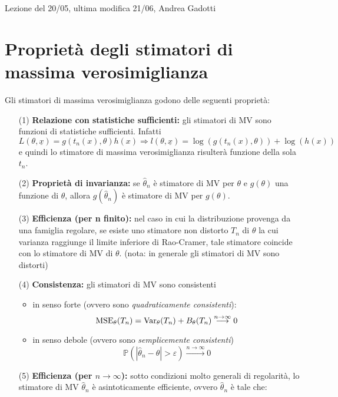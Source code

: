 
Lezione del 20/05, ultima modifica 21/06, Andrea Gadotti

\section{Proprietà degli stimatori di massima verosimiglianza}

Gli stimatori di massima verosimiglianza godono delle seguenti proprietà:

\begin{enumerate}

\item[(1)] \textbf{Relazione con statistiche sufficienti:} gli stimatori di MV sono funzioni di statistiche sufficienti. Infatti
$$L(\theta, \underline{x})=g(t_n(x),\theta) h(x) \Longrightarrow l(\theta, \underline{x})=\log(g(t_n(x),\theta)) + \log(h(x))$$
e quindi lo stimatore di massima verosimiglianza risulterà funzione della sola $t_n$.
\item[(2)] \textbf{Proprietà di invarianza:} se $\hat{\theta}_n$ è stimatore di MV per $\theta$ e $g(\theta)$ una funzione di $\theta$, allora $g(\hat{\theta}_n)$ è stimatore di MV per $g(\theta)$.
\item[(3)] \textbf{Efficienza (per n finito):} nel caso in cui la distribuzione provenga da una famiglia regolare, se esiste uno stimatore non distorto $T_n$ di $\theta$ la cui varianza raggiunge il limite inferiore di Rao-Cramer, tale stimatore coincide con lo stimatore di MV di $\theta$. (nota: in generale gli stimatori di MV sono distorti)
\item[(4)] \textbf{Consistenza:} gli stimatori di MV sono consistenti
\begin{itemize}
\item in senso forte (ovvero sono \emph{quadraticamente consistenti}):
$$\operatorname{MSE}_{\theta}(T_n)=\operatorname{Var}_{\theta}(T_n)+B_{\theta}(T_n) \stackrel{n \rightarrow \infty}{\longrightarrow} 0$$
\item in senso debole (ovvero sono \emph{semplicemente consistenti})
$$\mathbb{P}(|\hat{\theta}_n-\theta|>\varepsilon) \stackrel{n \rightarrow \infty}{\longrightarrow} 0$$
\end{itemize}
\item[(5)] \textbf{Efficienza (per $n \rightarrow \infty$):} sotto condizioni molto generali di regolarità, lo stimatore di MV $\hat{\theta}_n$ è asintoticamente efficiente, ovvero $\hat{\theta}_n$ è tale che:
\begin{enumerate}

\end{enumerate}
\end{enumerate}
